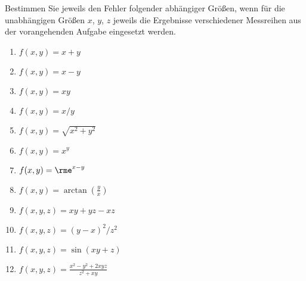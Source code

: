 \pagebreak



Bestimmen Sie jeweils den Fehler folgender abhängiger Größen, wenn für die
unabhängigen Größen $x$, $y$, $z$ jeweils die Ergebnisse verschiedener
Messreihen aus der vorangehenden Aufgabe eingesetzt werden.\\
\parbox{0.5\textwidth}{\begin{enumerate}
\item $f(x,y)=x+y$
\item $f(x,y)=x-y$
\item $f(x,y)=xy$
\item $f(x,y)=x/y$
\item $f(x,y)=\sqrt{x^2+y^2}$
\item $f(x,y)=x^y$
\end{enumerate}}\parbox{0.5\textwidth}{\begin{enumerate}\setcounter{enumi}{6}
\item $f(x,y)=\rme^{x-y}$
\item $f(x,y)=\arctan\left(\frac{y}{x}\right)$
\item $f(x,y,z)=xy+yz-xz$
\item $f(x,y,z)=(y-x)^2/z^2$
\item $f(x,y,z)=\sin(xy+z)$
\item $f(x,y,z)=\frac{x^2-y^2+2xyz}{z^2+xy}$
\end{enumerate}}

